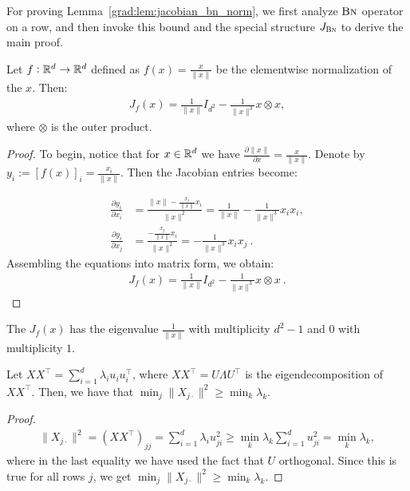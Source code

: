For proving Lemma~\ref{grad:lem:jacobian_bn_norm}, we first analyze $\text{\sc{Bn}}$ operator on a row, and then invoke this bound and the special structure $J_{\text{\sc{Bn}}}$ to derive the main proof. 



\begin{lemma}
\label{grad:lem:jacobian_normalization}
    Let $f: \mathbb{R}^d \to \mathbb{R}^d$ defined as $f(x) = \frac{x}{\|x\|}$ be the elementwise normalization of the $x$. Then:
    \begin{align}
        J_f(x) = \frac{1}{\|x\|} I_{d^2} - \frac{1}{\|  x\|^3} x \otimes x,
    \end{align}
    where $\otimes$ is the outer product.
\end{lemma}
\begin{proof}
    To begin, notice that for $x \in \mathbb{R}^d$ we have $\frac{\partial \| x \|}{\partial x} = \frac{x}{\| x \|}$.
    Denote by $y_i := \left[f(x) \right]_i = \frac{x_i}{\| x \|}$. Then the Jacobian entries become:

    \begin{align}
    \frac{\partial y_i}{\partial x_i} &= \frac{\| x \| - \frac{x_i}{\|x\|} x_i}{\|x\|^2} = \frac{1}{\|x\|} - \frac{1}{\|x\|^3}x_i x_i, \\
    \frac{\partial y_i}{\partial x_j} &= \frac{- \frac{x_j}{\|x\|} x_i}{\|x\|^2} = -\frac{1}{\|x\|^3}x_ix_j~.
    \end{align}
    Assembling the equations into matrix form, we obtain:
    \begin{align}
        J_f(x) = \frac{1}{\|x\|} I_{d^2} - \frac{1}{\|  x\|^3} x \otimes x~.
    \end{align}
\end{proof}
\begin{corollary}
    \label{grad:cor:jac_spectrum}
    The $J_f(x)$ has the eigenvalue $\frac{1}{\|x\|}$ with multiplicity $d^2 - 1$ and $0$ with multiplicity $1$.
\end{corollary}


\begin{lemma}
    \label{grad:lem:rownorm_var}
     Let $X X^\top = \sum_{i=1}^d \lambda_i u_i u_i^\top$, where $XX^\top = U\Lambda U^\top$ is the eigendecomposition of $XX^\top$. Then, we have that $\min_j \| X_{j\cdot} \|^2 \geq \min_k \lambda_k$.
\end{lemma}
\begin{proof}
    \begin{align}
    \|X_{j\cdot}\|^2 = (X X^\top)_{jj} 
    = \sum_{i=1}^d \lambda_i u_{ji}^2
    \geq \min_k \lambda_k \sum_{i=1}^d u_{ji}^2 
    = \min_k \lambda_k,
    \end{align}
    where in the last equality we have used the fact that $U$ orthogonal.
    Since this is true for all rows $j$, we get $\min_j \|X_{j\cdot}\|^2 \geq \min_k \lambda_k$.
\end{proof}

